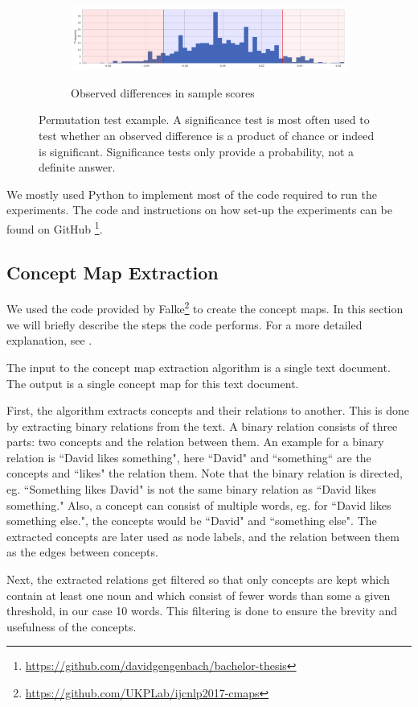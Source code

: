 \begin{figure}[htb!]
  \begin{subfigure}[t]{\linewidth}
  {\includegraphics[width=1\textwidth]{assets/figures/permutation_test/distribution.pdf}\label{fig:permutation_test_distribution}}
  \caption{Observed differences in sample scores}
  \end{subfigure}
  \caption[Example: Permutation Test]{Permutation test example. A significance test is most often used to test whether an observed difference is a product of chance or indeed is significant. Significance tests only provide a probability, not a definite answer.}
  \label{fig:example_permutation_test}
\end{figure}


We mostly used Python to implement most of the code required to run the experiments.
The code and instructions on how set-up the experiments can be found on GitHub \footnote{\url{https://github.com/davidgengenbach/bachelor-thesis}}.

\subsection{Concept Map Extraction}
We used the code provided by Falke\footnote{\url{https://github.com/UKPLab/ijcnlp2017-cmaps}}  to create the concept maps.
In this section we will briefly describe the steps the code performs. For a more detailed explanation, see \cite{Falke2017}.

The input to the concept map extraction algorithm is a single text document. The output is a single concept map for this text document.

First, the algorithm extracts concepts and their relations to another.
This is done by extracting binary relations from the text. A binary relation consists of three parts: two concepts and the relation between them. An example for a binary relation is ``David likes something", here ``David" and ``something`` are the concepts and ``likes" the relation them. Note that the binary relation is directed, eg. ``Something likes David" is not the same binary relation as ``David likes something."
Also, a concept can consist of multiple words, eg. for ``David likes something else.", the concepts would be ``David" and ``something else".
The extracted concepts are later used as node labels, and the relation between them as the edges between concepts.

Next, the extracted relations get filtered so that only concepts are kept which contain at least one noun and which consist of fewer words than some a given threshold, in our case 10 words. This filtering is done to ensure the brevity and usefulness of the concepts.
